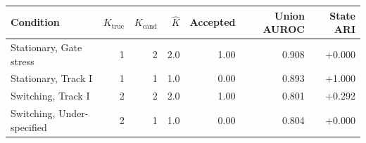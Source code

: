 \begin{tabular}{lrrrrrr}
\toprule
Condition & $K_{\mathrm{true}}$ & $K_{\mathrm{cand}}$ & $\hat K$ & Accepted & Union AUROC & State ARI \\
\midrule
Stationary, Gate stress & 1 & 2 & 2.0 & 1.00 & 0.908 & +0.000 \\
Stationary, Track I & 1 & 1 & 1.0 & 0.00 & 0.893 & +1.000 \\
Switching, Track I & 2 & 2 & 2.0 & 1.00 & 0.801 & +0.292 \\
Switching, Under-specified & 2 & 1 & 1.0 & 0.00 & 0.804 & +0.000 \\
\bottomrule
\end{tabular}

